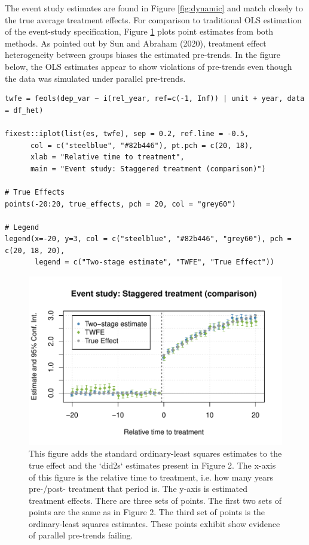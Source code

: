 The event study estimates are found in Figure \ref{fig:dynamic} and match closely to the true average treatment effects. For comparison to traditional OLS estimation of the event-study specification, Figure \ref{fig:dynamic-w-twfe} plots point estimates from both methods. As pointed out by Sun and Abraham (2020), treatment effect heterogeneity between groups biases the estimated pre-trends. In the figure below, the OLS estimates appear to show violations of pre-trends even though the data was simulated under parallel pre-trends.

\begin{verbatim}
twfe = feols(dep_var ~ i(rel_year, ref=c(-1, Inf)) | unit + year, data = df_het) 

fixest::iplot(list(es, twfe), sep = 0.2, ref.line = -0.5,
      col = c("steelblue", "#82b446"), pt.pch = c(20, 18), 
      xlab = "Relative time to treatment", 
      main = "Event study: Staggered treatment (comparison)")

# True Effects
points(-20:20, true_effects, pch = 20, col = "grey60")

# Legend
legend(x=-20, y=3, col = c("steelblue", "#82b446", "grey60"), pch = c(20, 18, 20), 
       legend = c("Two-stage estimate", "TWFE", "True Effect"))
\end{verbatim}

\begin{figure}
\includegraphics[width=1\linewidth]{did2s_files/figure-latex/dynamic-w-twfe-1} \caption{This figure adds the standard ordinary-least squares estimates to the true effect and the `did2s` estimates present in Figure 2. The x-axis of this figure is the relative time to treatment, i.e. how many years pre-/post- treatment that period is. The y-axis is estimated treatment effects. There are three sets of points. The first two sets of points are the same as in Figure 2. The third set of points is the ordinary-least squares estimates. These points exhibit show evidence of parallel pre-trends failing.}\label{fig:dynamic-w-twfe}
\end{figure}

